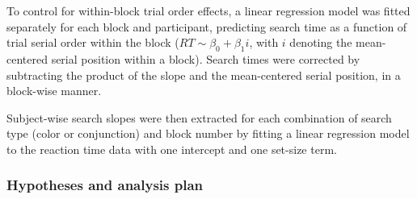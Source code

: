 \documentclass[12pt,twoside]{reedthesis}
\begin{document}
To control for within-block trial order effects, a linear regression model was fitted separately for each block and participant, predicting search time as a function of trial serial order within the block (\(RT \sim \beta_0+\beta_1i\), with \(i\) denoting the mean-centered serial position within a block). Search times were corrected by subtracting the product of the slope and the mean-centered serial position, in a block-wise manner.

Subject-wise search slopes were then extracted for each combination of search type (color or conjunction) and block number by fitting a linear regression model to the reaction time data with one intercept and one set-size term.

\hypertarget{hypotheses-and-analysis-plan}{%
\subsubsection{Hypotheses and analysis plan}\label{hypotheses-and-analysis-plan}}
\end{document}
